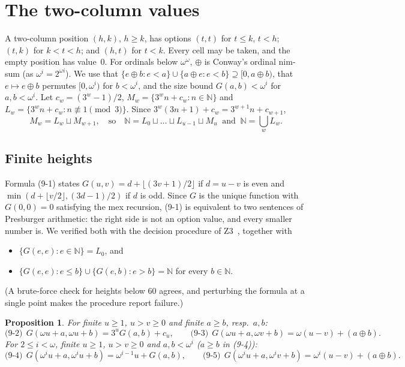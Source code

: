 \documentclass[11pt]{amsart}
\newtheorem{proposition}[theorem]{Proposition}
\theoremstyle{definition}
\theoremstyle{remark}
\newcommand{\G}{G}
\newcommand{\nim}{\oplus}
\begin{document}
\appendix
\section{The two-column values}\label{app:two}

A two-column position $(h,k)$, $h\ge k$, has options $(t,t)$ for $t\le k$, $t<h$; $(t,k)$ for
$k<t<h$; and $(h,t)$ for $t<k$. Every cell may be taken, and the empty position has value~$0$.
For ordinals below $\omega^\omega$, $\nim$ is Conway's ordinal nim-sum (as
$\omega^i=2^{\omega i}$). We use that $\{e\nim b:e<a\}\cup\{a\nim e:e<b\}\supseteq[0,a\nim b)$,
that $e\mapsto e\nim b$ permutes $[0,\omega^i)$ for $b<\omega^i$, and the size bound
$\G(a,b)<\omega^i$ for $a,b<\omega^i$. Let $c_w=(3^w-1)/2$,
$M_w=\{3^wn+c_w:n\in\mathbb N\}$ and $L_w=\{3^wn+c_w:n\not\equiv1\pmod 3\}$. Since
$3^w(3n+1)+c_w=3^{w+1}n+c_{w+1}$,
\begin{equation}\label{eq:N1}
M_w=L_w\sqcup M_{w+1},\quad\text{so}\quad \mathbb N=L_0\sqcup\dots\sqcup L_{u-1}\sqcup M_u
\ \text{ and }\ \mathbb N=\textstyle\bigcup_wL_w .
\end{equation}

\subsection*{Finite heights}
Formula (9-1) states $\G(u,v)=d+\lfloor(3v+1)/2\rfloor$ if $d=u-v$ is even and
$\min(d+\lfloor v/2\rfloor,(3d-1)/2)$ if $d$ is odd. Since $\G$ is the unique function with
$\G(0,0)=0$ satisfying the mex recursion, (9-1) is equivalent to two sentences of Presburger
arithmetic: the right side is not an option value, and every smaller number is. We verified
both with the decision procedure of Z3~\cite{Z3}, together with
\begin{itemize}
\item[(D0)] $\{\G(e,e):e\in\mathbb N\}=L_0$, and
\item[(B0)] $\{\G(e,e):e\le b\}\cup\{\G(e,b):e>b\}=\mathbb N$ for every $b\in\mathbb N$.
\end{itemize}
(A brute-force check for heights below $60$ agrees, and perturbing the formula at a single
point makes the procedure report failure.)

\begin{proposition}
For finite $u\ge1$, $u>v\ge0$ and finite $a\ge b$, resp.\ $a,b$:
\[
\text{(9-2)}\ \ \G(\omega u+a,\omega u+b)=3^u\G(a,b)+c_u,\qquad
\text{(9-3)}\ \ \G(\omega u+a,\omega v+b)=\omega(u-v)+(a\nim b).
\]
For $2\le i<\omega$, finite $u\ge1$, $u>v\ge0$ and $a,b<\omega^i$ ($a\ge b$ in (9-4)):
\[
\text{(9-4)}\ \ \G(\omega^iu+a,\omega^iu+b)=\omega^{i-1}u+\G(a,b),\qquad
\text{(9-5)}\ \ \G(\omega^iu+a,\omega^iv+b)=\omega^i(u-v)+(a\nim b).
\]
\end{proposition}
\end{document}
